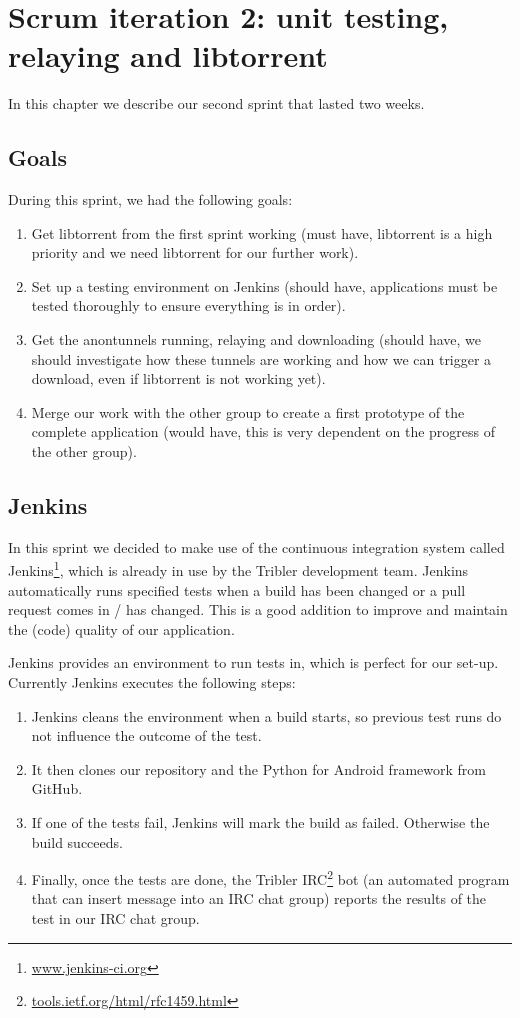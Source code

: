 \chapter{Scrum iteration 2: unit testing, relaying and libtorrent}
\label{cpt:iteration2}
	In this chapter we describe our second sprint that lasted two weeks.

	\section{Goals}
		During this sprint, we had the following goals:
	
		\begin{enumerate}
			\item Get libtorrent from the first sprint working (must have, libtorrent is a high priority and we need libtorrent for our further work).
			\item Set up a testing environment on Jenkins (should have, applications must be tested thoroughly to ensure everything is in order).
			\item Get the anontunnels running, relaying and downloading (should have, we should investigate how these tunnels are working and how we can trigger a download, even if libtorrent is not working yet).
			\item Merge our work with the other group to create a first prototype of the complete application (would have, this is very dependent on the progress of the other group).
		\end{enumerate}
	
	\section{Jenkins}
		\label{sec:jenkins}
		In this sprint we decided to make use of the continuous integration system called Jenkins\footnote{\href{http://jenkins-ci.org}{www.jenkins-ci.org}}, which is already in use by the Tribler development team. Jenkins automatically runs specified tests when a build has been changed or a pull request comes in / has changed. This is a good addition to improve and maintain the (code) quality of our application.
		
		Jenkins provides an environment to run tests in, which is perfect for our set-up. Currently Jenkins executes the following steps:
		
		\begin{enumerate}
			\item Jenkins cleans the environment when a build starts, so previous test runs do not influence the outcome of the test.
			\item It then clones our repository and the Python for Android framework from GitHub.
			\item If one of the tests fail, Jenkins will mark the build as failed. Otherwise the build succeeds.
			\item Finally, once the tests are done, the Tribler IRC\footnote{\href{http://tools.ietf.org/html/rfc1459.html}{tools.ietf.org/html/rfc1459.html}} bot (an automated program that can insert message into an IRC chat group) reports the results of the test in our IRC chat group.
		\end{enumerate} 
		
